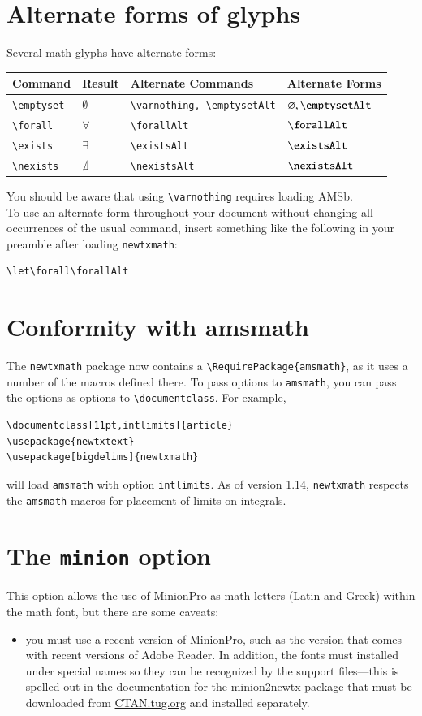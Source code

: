\documentclass[11pt]{article}
\begin{document}
\section{Alternate forms of glyphs}
Several math glyphs have alternate forms:
\begin{center}
  \begin{tabular}{@{} llll @{}}
    \hline
    Command & Result &  Alternate Commands & Alternate Forms\\ 
    \hline
    \verb|\emptyset| & $\emptyset$ & \verb|\varnothing, \emptysetAlt|& $\varnothing, \emptysetAlt$ \\ 
    \verb|\forall| & $\forall$ & \verb|\forallAlt| & $\forallAlt$ \\ 
    \verb|\exists| & $\exists$ & \verb|\existsAlt| & $\existsAlt$ \\ 
    \verb|\nexists| & $\nexists$ & \verb|\nexistsAlt| & $\nexistsAlt$ \\ 
    \hline
  \end{tabular}
\end{center}
You should be aware that using \verb|\varnothing| requires loading AMSb.\\
To use an alternate form throughout your document without changing all occurrences of the usual command, insert something like the following in your preamble after loading \texttt{newtxmath}:
\begin{verbatim}
\let\forall\forallAlt
\end{verbatim}
\section{Conformity with amsmath}
The {\tt newtxmath} package now contains a \verb|\RequirePackage{amsmath}|, as it uses a number of the macros defined there. To pass options to {\tt amsmath}, you can pass the options as options to \verb|\documentclass|. For example,
\begin{verbatim}
\documentclass[11pt,intlimits]{article}
\usepackage{newtxtext}
\usepackage[bigdelims]{newtxmath}
\end{verbatim}
will load {\tt amsmath} with option {\tt intlimits}. As of version 1.14, {\tt newtxmath} respects the {\tt amsmath} macros for placement of limits on integrals.

\section{The {\tt minion} option}
This option allows the use of MinionPro as math letters (Latin and Greek) within  the math font, but there are some caveats:
\begin{itemize}
\item
you must use a recent version of MinionPro, such as the version that comes with recent versions of Adobe Reader. In addition, the fonts must installed under special names so they can be recognized by the support files---this is spelled out in the documentation for the minion2newtx package that must be downloaded from \url{CTAN.tug.org} and installed separately.
\end{itemize}
\end{document}
